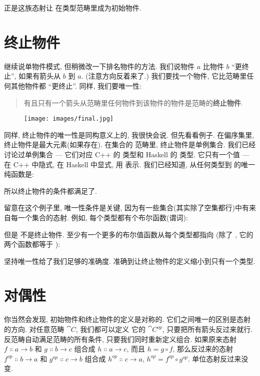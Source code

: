 正是这族态射让  在类型范畴里成为初始物件.

\section{终止物件}

继续说单物件模式, 但稍微改一下排名物件的方法. 我们说物件 $a$ 比物件 $b$ ``更终止'', 如果有箭头从 $b$ 到 $a$.
(注意方向反着来了.) 我们要找一个物件, 它比范畴里任何其他物件都 ``更终止''. 同样, 我们要唯一性:

\begin{quote}
  有且只有一个箭头从范畴里任何物件到该物件的物件是范畴的\textbf{终止物件}.
\end{quote}

\begin{figure}[H]
  \centering
  \texttt{[image: images/final.jpg]}
\end{figure}

\noindent
同样, 终止物件的唯一性是同构意义上的, 我很快会说. 但先看看例子. 在偏序集里, 终止物件是最大元素(如果存在). 在集合的
范畴里, 终止物件是单例集合. 我们已经讨论过单例集合 --- 它们对应 C++ 的  类型和 Haskell 的 \code{()} 类型.
它只有一个值 --- 在 C++ 中隐式, 在 Haskell 中显式, 用 \code{()} 表示. 我们已经知道, 从任何类型到 \code{()} 的唯一
纯函数是:

所以终止物件的条件都满足了.

留意在这个例子里, 唯一性条件是关键, 因为有一些集合(其实除了空集都行)中有来自每一个集合的态射.
例如, 每个类型都有个布尔函数(谓词):

但是  不是终止物件. 至少有一个更多的布尔值函数从每个类型都指向 
(除了 , 它的两个函数都等于 ):

坚持唯一性给了我们足够的准确度. 准确到让终止物件的定义缩小到只有一个类型.

\section{对偶性}

你当然会发现, 初始物件和终止物件的定义是对称的. 它们之间唯一的区别是态射的方向. 对任意范畴 $\cat{C}$, 我们都可以定义
它的 $\cat{C}^{op}$, 只要把所有箭头反过来就行. 反范畴自动满足范畴的所有条件,
只要我们同时重新定义组合. 如果原来态射 $f \Colon a \to b$ 和 $g \Colon b \to c$ 组合成 $h \Colon a \to c$, 而且
$h = g \circ f$, 那么反过来的态射 $f^{op} \Colon b \to a$ 和 $g^{op} \Colon c \to b$ 组合成 $h^{op} \Colon c \to a$,
$h^{op} = f^{op} \circ g^{op}$. 单位态射反过来没变.

